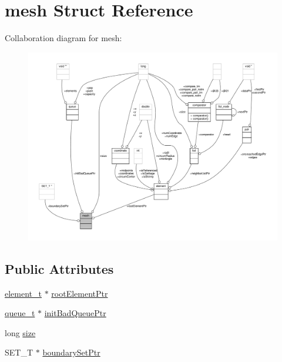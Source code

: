 \hypertarget{structmesh}{\section{mesh Struct Reference}
\label{structmesh}
}


Collaboration diagram for mesh\-:
\nopagebreak
\begin{figure}[H]
\begin{center}
\leavevmode
\includegraphics[width=350pt]{structmesh__coll__graph}
\end{center}
\end{figure}
\subsection*{Public Attributes}
\begin{DoxyCompactItemize}
\item 
\hyperlink{element_8h_a3578cc557f82ebb906d8224ce230ef38}{element\-\_\-t} $\ast$ \hyperlink{structmesh_ab02e5e11b22030d16854bbeb18345175}{root\-Element\-Ptr}
\item 
\hyperlink{queue_8h_aa8acf648f3b0c69d7e132fcc61dc58c7}{queue\-\_\-t} $\ast$ \hyperlink{structmesh_a0847d2acb6a5ff2de49318d9e615a814}{init\-Bad\-Queue\-Ptr}
\item 
long \hyperlink{structmesh_a250138529b18c349886b4749b406cd59}{size}
\item 
S\-E\-T\-\_\-\-T $\ast$ \hyperlink{structmesh_a5a4282113915f47cdd8b502a1a3e939a}{boundary\-Set\-Ptr}
\end{DoxyCompactItemize}



